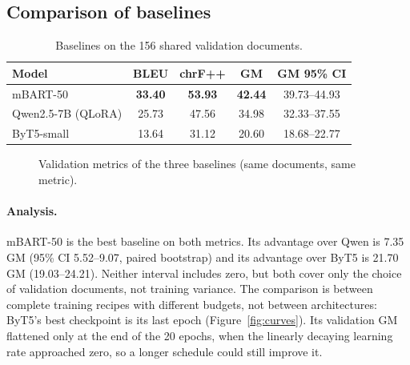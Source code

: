 \documentclass[a4paper,12pt]{article}
\begin{document}
\subsection{Comparison of baselines}

\begin{table}[H]
    \centering
    \caption{Baselines on the 156 shared validation documents.}
    \label{tab:baselines}
    \begin{tabular}{lcccc}
        \toprule
        \textbf{Model} & \textbf{BLEU} & \textbf{chrF++} & \textbf{GM} & \textbf{GM 95\% CI} \\
        \midrule
        mBART-50 & \textbf{33.40} & \textbf{53.93} & \textbf{42.44} & 39.73--44.93 \\
        Qwen2.5-7B (QLoRA) & 25.73 & 47.56 & 34.98 & 32.33--37.55 \\
        ByT5-small & 13.64 & 31.12 & 20.60 & 18.68--22.77 \\
        \bottomrule
    \end{tabular}
\end{table}

\begin{figure}[H]
    \centering
    \caption{Validation metrics of the three baselines (same documents, same metric).}
    \label{fig:metrics}
\end{figure}

\paragraph{Analysis.}
mBART-50 is the best baseline on both metrics. Its advantage over Qwen is 7.35 GM (95\% CI 5.52--9.07, paired bootstrap) and its advantage over ByT5 is 21.70 GM (19.03--24.21). Neither interval includes zero, but both cover only the choice of validation documents, not training variance. The comparison is between complete training recipes with different budgets, not between architectures: ByT5's best checkpoint is its last epoch (Figure~\ref{fig:curves}). Its validation GM flattened only at the end of the 20 epochs, when the linearly decaying learning rate approached zero, so a longer schedule could still improve it.
\end{document}
